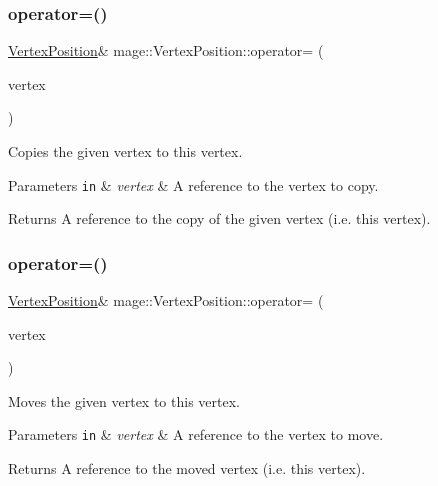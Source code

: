 \subsubsection{\texorpdfstring{operator=()}{operator=()}\hspace{0.1cm}{\footnotesize\ttfamily [1/2]}}
{\footnotesize\ttfamily \hyperlink{structmage_1_1_vertex_position}{Vertex\+Position}\& mage\+::\+Vertex\+Position\+::operator= (\begin{DoxyParamCaption}\item[{const \hyperlink{structmage_1_1_vertex_position}{Vertex\+Position} \&}]{vertex }\end{DoxyParamCaption})\hspace{0.3cm}{\ttfamily [default]}}

Copies the given vertex to this vertex.


\begin{DoxyParams}[1]{Parameters}
\mbox{\tt in}  & {\em vertex} & A reference to the vertex to copy. \\
\hline
\end{DoxyParams}
\begin{DoxyReturn}{Returns}
A reference to the copy of the given vertex (i.\+e. this vertex). 
\end{DoxyReturn}
\hypertarget{structmage_1_1_vertex_position_a37000c522dc4d0078ac879dc46532911}{}\label{structmage_1_1_vertex_position_a37000c522dc4d0078ac879dc46532911} 
\subsubsection{\texorpdfstring{operator=()}{operator=()}\hspace{0.1cm}{\footnotesize\ttfamily [2/2]}}
{\footnotesize\ttfamily \hyperlink{structmage_1_1_vertex_position}{Vertex\+Position}\& mage\+::\+Vertex\+Position\+::operator= (\begin{DoxyParamCaption}\item[{\hyperlink{structmage_1_1_vertex_position}{Vertex\+Position} \&\&}]{vertex }\end{DoxyParamCaption})\hspace{0.3cm}{\ttfamily [default]}}

Moves the given vertex to this vertex.


\begin{DoxyParams}[1]{Parameters}
\mbox{\tt in}  & {\em vertex} & A reference to the vertex to move. \\
\hline
\end{DoxyParams}
\begin{DoxyReturn}{Returns}
A reference to the moved vertex (i.\+e. this vertex). 
\end{DoxyReturn}


